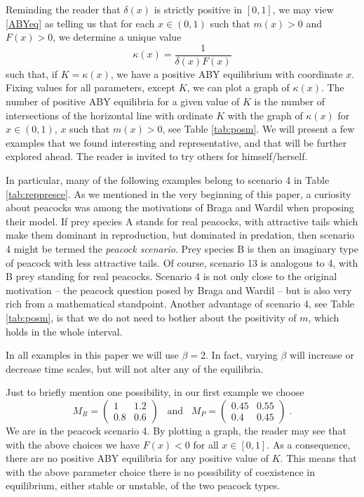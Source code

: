 \documentclass[12pt]{article}
\theoremstyle{definition}
\begin{document}
Reminding the reader that $\delta(x)$ is strictly positive in $[0,1]$, we may view \eqref{ABYeq} as telling us that for each $x \in (0,1)$ such that $m(x)>0$ and $F(x)>0$, we determine a unique value
\begin{equation}  \label{defkappa}
	\kappa(x)= \frac{1}{\delta(x)F(x)}
\end{equation}
such that, if $K=\kappa(x)$, we have a positive ABY equilibrium with coordinate $x$. Fixing values for all parameters, except $K$, we can plot a graph of $\kappa(x)$. The number of positive ABY equilibria for a given value of $K$ is the number of intersections of the horizontal line with ordinate $K$ with the graph of $\kappa(x)$ for $x\in(0,1)$, $x$ such that $m(x)>0$, see Table \ref{tab:posm}. We will present a few examples that we found interesting and representative, and that will be further explored ahead. The reader is invited to try others for himself/herself. 

In particular, many of the following examples belong to scenario 4 in Table \ref{tab:reppresce}. As we mentioned in the very beginning of this paper, a curiosity about peacocks was among the motivations of Braga and Wardil \cite{bw} when proposing their model. If prey species A stands for real peacocks, with attractive tails which make them dominant in reproduction, but dominated in predation, then scenario 4 might be termed the \emph{peacock scenario}. Prey species B is then an imaginary type of peacock with less attractive tails. Of course, scenario 13 is analogous to 4, with B prey standing for real peacocks. Scenario 4 is not only close to the original motivation -- the peacock question posed by Braga and Wardil -- but is also very rich from a mathematical standpoint. Another advantage of scenario 4, see Table \ref{tab:posm}, is that we do not need to bother about the positivity of $m$, which holds in the whole interval.

In all examples in this paper we will use $\beta=2$. In fact, varying $\beta$ will increase or decrease time scales, but will not alter any of the equilibria.

Just to briefly mention one possibility, in our first example we choose
\begin{equation}
	M_R= \begin{pmatrix}
		1&1.2\\
		0.8&0.6
	\end{pmatrix} \;\;\;\mathrm{and}\;\;\;M_P= \begin{pmatrix}
		0.45&0.55\\
		0.4&0.45
	\end{pmatrix} \;.
\end{equation}
We are in the peacock scenario 4. By plotting a graph, the reader may see that with the above choices we have $F(x)<0$ for all $x \in [0,1]$. As a consequence, there are no positive ABY equilibria for any positive value of $K$. This means that with the above parameter choice there is no possibility of coexistence in equilibrium, either stable or unstable, of the two peacock types.
\end{document}
